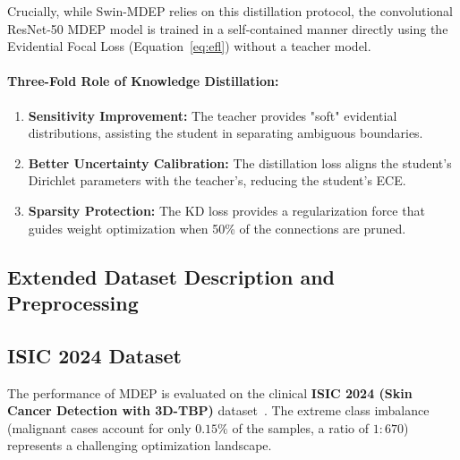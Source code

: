 \documentclass[letterpaper]{article} %
\begin{document}
Crucially, while Swin-MDEP relies on this distillation protocol, the convolutional ResNet-50 MDEP model is trained in a self-contained manner directly using the Evidential Focal Loss (Equation~\ref{eq:efl}) without a teacher model.

\paragraph{Three-Fold Role of Knowledge Distillation:}
\begin{enumerate}
    \item \textbf{Sensitivity Improvement:} The teacher provides "soft" evidential distributions, assisting the student in separating ambiguous boundaries.
    \item \textbf{Better Uncertainty Calibration:} The distillation loss aligns the student's Dirichlet parameters with the teacher's, reducing the student's ECE.
    \item \textbf{Sparsity Protection:} The KD loss provides a regularization force that guides weight optimization when 50\% of the connections are pruned.
\end{enumerate}


\subsection{Extended Dataset Description and Preprocessing}
\subsection{ISIC 2024 Dataset}\label{subsec:isic}

The performance of MDEP is evaluated on the clinical \textbf{ISIC 2024 (Skin Cancer Detection with 3D-TBP)} dataset~\cite{isic2024, codella2019skin, tschandl2018ham10000}. The extreme class imbalance (malignant cases account for only $0.15\%$ of the samples, a ratio of $1{:}670$) represents a challenging optimization landscape.
\end{document}
